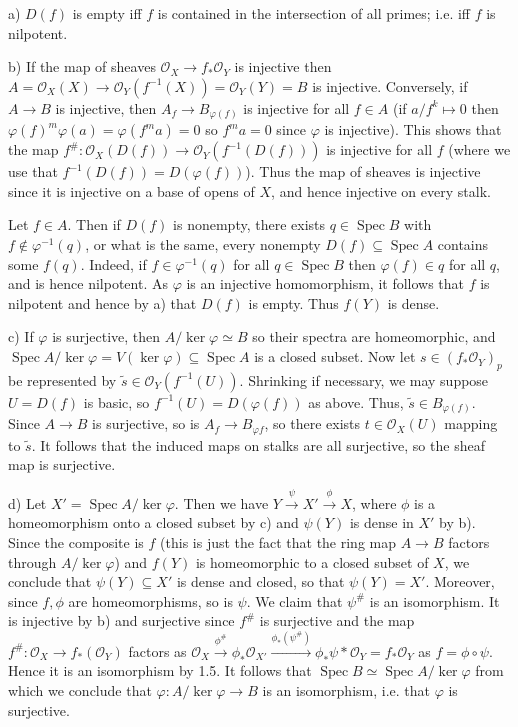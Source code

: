 \documentclass{report}
\renewcommand{\O}{\mathcal{O}}
\DeclareMathOperator{\Spec}{Spec}
\begin{document}
\bigskip
{}	a)	$D(f)$ is empty iff $f$ is contained in the intersection of all primes; i.e. iff $f$ is nilpotent.

\noindent
b)	If the map of sheaves $\O_X\rightarrow f_*\O_Y$ is injective then $A=\O_X(X)\rightarrow \O_Y(f^{-1}(X))=\O_Y(Y)=B$
is injective.  Conversely, if $A\rightarrow B$ is injective, then $A_{f}\rightarrow B_{\varphi(f)}$ is injective for
all $f\in A$ (if $a/f^k\mapsto 0$ then $\varphi(f)^m\varphi(a)=\varphi(f^m a)=0$ so $f^ma=0$ since $\varphi$ is injective).
This shows that the map $f^{\#}:\O_X(D(f))\rightarrow \O_Y(f^{-1}(D(f)))$ is injective for all $f$ (where
we use that $f^{-1}(D(f))=D(\varphi(f))$).	Thus the map of sheaves is injective since it is injective on a base
of opens of $X$, and hence injective on every stalk.

Let $f\in A$.  Then if $D(f)$ is nonempty, there exists $q\in\Spec B$ with $f\not\in \varphi^{-1}(q)$, or what is the same,
every nonempty $D(f)\subseteq\Spec A$ contains some $f(q)$.  Indeed, if $f\in\varphi^{-1}(q)$ for all $q\in\Spec B$
then $\varphi(f)\in q$ for all $q$, and is hence nilpotent.  As $\varphi$ is an injective homomorphism, it follows that $f$
is nilpotent and hence by a) that $D(f)$ is empty.  Thus $f(Y)$ is dense.

\noindent
c)	If $\varphi$ is surjective, then $A/\ker\varphi\simeq B$ so their spectra are homeomorphic,
and $\Spec A/\ker\varphi=V(\ker\varphi)\subseteq \Spec A$ is a closed subset.	Now let $s\in (f_*\O_Y)_p$
be represented by $\widetilde{s}\in \O_Y(f^{-1}(U))$.  Shrinking if necessary, we may suppose $U=D(f)$
is basic, so $f^{-1}(U)=D(\varphi(f))$ as above.  Thus, $\widetilde{s}\in B_{\varphi(f)}$.  Since $A\rightarrow B$
is surjective, so is $A_f\rightarrow B_{\varphi{f}}$, so there exists $t\in \O_X(U)$ mapping to $\widetilde{s}$.
It follows that the induced maps on stalks are all surjective, so the sheaf map is surjective.

\noindent
d)	Let $X'=\Spec A/\ker\varphi$.  Then we have $Y\xrightarrow{\psi} X'\xrightarrow{\phi}X$,
where $\phi$ is a homeomorphism onto a closed subset by c) and $\psi(Y)$ is dense in $X'$
by b).  Since the composite is $f$ (this is just the fact that the ring map $A\rightarrow B$
factors through $A/\ker\varphi$) and $f(Y)$ is homeomorphic to a closed subset of $X$,
we conclude that $\psi(Y)\subseteq X'$ is dense and closed, so that $\psi(Y)=X'$.
Moreover, since $f,\phi$ are homeomorphisms, so is $\psi.$	We claim that
$\psi^{\#}$ is an isomorphism.  It is injective by b) and surjective since $f^{\#}$ is surjective
and the map $f^{\#}:\O_X\rightarrow f_*(\O_Y)$ factors as
$\O_X\xrightarrow{\phi^{\#}} \phi_*\O_{X'}\xrightarrow{\phi_*(\psi^{\#})} \phi_*\psi* \O_Y=f_*\O_Y $
as $f=\phi\circ\psi$.	 Hence it is an isomorphism by 1.5.	It follows that $\Spec B\simeq \Spec A/\ker\varphi$
from which we conclude that $\varphi:A/\ker\varphi\rightarrow B$ is an isomorphism, i.e. that $\varphi$
is surjective.
\end{document}
